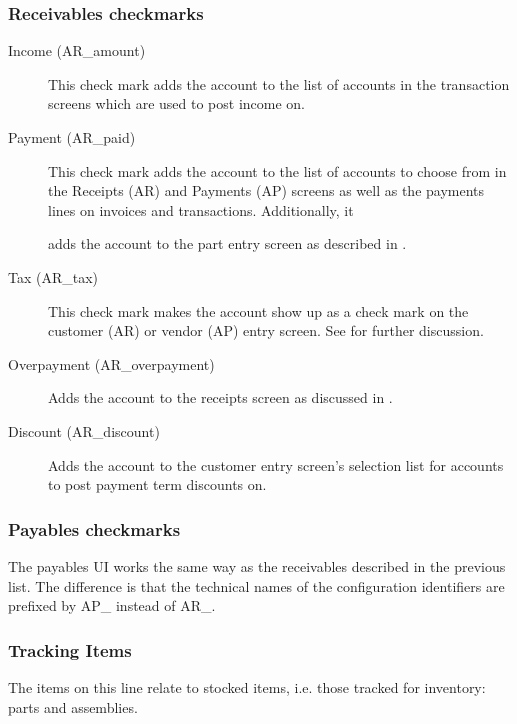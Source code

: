 \subsubsection{Receivables checkmarks}
\label{subsubsec-coa-AR-checkmarks}

\begin{description}
    \item[Income (AR\_amount)] This check mark adds the account to the list of accounts
    in the transaction screens which are used to post income on.

    \item[Payment (AR\_paid)] This check mark adds the account to the list of accounts
    to choose from in the Receipts (AR) and Payments (AP) screens as well as the payments lines on invoices and transactions. Additionally, it

    adds the account to the part entry screen as described in .
    \item[Tax (AR\_tax)] This check mark makes the account show up as a check mark on the
    \gls{customer} (AR) or vendor (AP) entry screen. See  for further discussion.
    \item[Overpayment (AR\_overpayment)] Adds the account to the receipts screen as discussed
    in .
    \item[Discount (AR\_discount)] Adds the account to the customer entry screen's selection
    list for accounts to post payment term discounts on.

\end{description}

\subsubsection{Payables checkmarks}
\label{subsubsec-coa-AP-checkmarks}

The payables UI works the same way as the receivables described in the previous list. The difference is
that the technical names of the configuration identifiers are prefixed by AP\_ instead
of AR\_.

\subsubsection{Tracking Items}
\label{subsubsec-coa-tracking-items}

The items on this line relate to stocked items, i.e. those tracked for inventory: parts and
assemblies.

